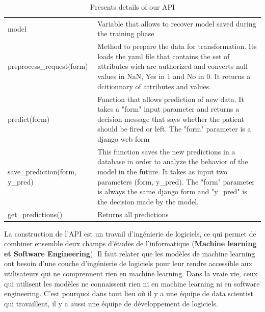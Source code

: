 \documentclass[12pt, french]{report}
\begin{document}
\begin{table}[h]
	\centering
	\begin{tabular}{|p{6cm}|p{10cm}|}
		\hline
		\thead{Attribute or Method} & \thead{Comments}\\
		\hline
		 model & Variable that allows to recover model saved during the training phase  \\
		 \hline
		 preprocess\_request(form) & Method to prepare the data for transformation. Its loads the yaml file that contains the set of attributes wich are authorized and converts null values in NaN, Yes in 1 and No in 0. It returns a dcitionnary of attributes and values. \\
		 \hline
		 predict(form) & Function that allows prediction of new data. It takes a "form" input parameter and returns a decision message that says whether the patient should be fired or left. The "form" parameter is a django web form\\
		 \hline
		save\_prediction(form, y\_pred) & This function saves the new predictions in a database in order to analyze the behavior of the model in the future. It takes as input two parameters (form, y\_pred). The "form" parameter is always the same django form and "y\_pred" is the decision made by the model.\\
		\hline
		get\_predictions() & Returns all predictions\\
		\hline
	\end{tabular}
	\caption{Presents details of our API}
	\label{tab:api}
\end{table}

La construction de l'API est un travail d'ingénierie de logiciels, ce qui permet de combiner ensemble deux champs d'études de l'informatique (\textbf{Machine learning et Software Engineering}). Il faut relater que les modèles de machine learning ont besoin d'une couche d'ingénierie de logiciels pour leur rendre accessible aux utilisateurs qui ne comprennent rien en machine learning. Dans la vraie vie, ceux qui utilisent les modèles ne connaissent rien ni en machine learning ni en software engineering. C'est pourquoi dans tout lieu où il y a une équipe de data scientist qui travaillent, il y a aussi une équipe de développement de logiciels.

\newpage
\end{document}
